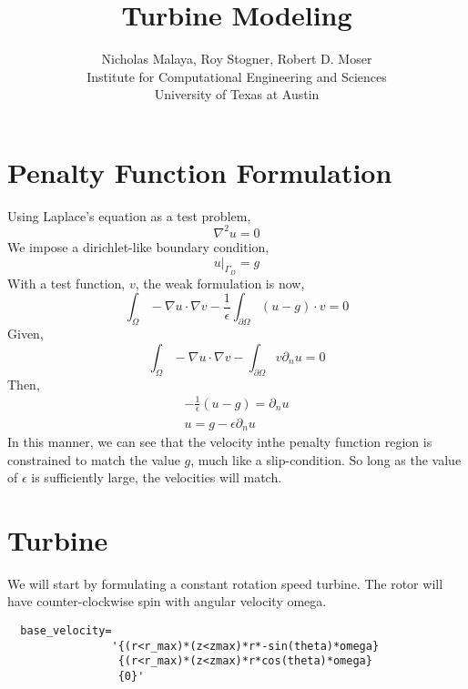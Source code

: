 \documentclass{article}
\title{\bf{Turbine Modeling}}
\author{Nicholas Malaya, Roy Stogner, Robert D. Moser \\ Institute for Computational Engineering and Sciences \\ University of Texas at Austin} \date{}
\begin{document}
\maketitle

\newpage

\section{Penalty Function Formulation}

Using Laplace's equation as a test problem, 
\begin{equation}
 \nabla^2 u = 0 
\end{equation}
We impose a dirichlet-like boundary condition, 
\begin{equation}
 u|_{\Gamma_D} = g
\end{equation}
With a test function, $v$, the weak formulation is now, 
\begin{equation}
\int_{\Omega}  - \nabla u \cdot \nabla v - \frac{1}{\epsilon}
 \int_{\partial \Omega} (u-g) \cdot v = 0 
\end{equation}
Given, 
\begin{equation}
\int_{\Omega}  - \nabla u \cdot \nabla v - 
 \int_{\partial \Omega} v \partial_n u = 0 
\end{equation}
Then, 
\begin{align}
-\frac{1}{\epsilon}(u-g) = \partial_n u \\
 u = g - \epsilon \partial_n u 
\end{align}
In this manner, we can see that the velocity inthe penalty function
region is constrained to match the value $g$, much like a
slip-condition. So long as the value of $\epsilon$ is sufficiently
large, the velocities will match. 


\section{Turbine}

We will start by formulating a constant rotation speed
turbine. The rotor will have counter-clockwise spin with angular
velocity omega.   

\begin{verbatim}
  base_velocity=
                '{(r<r_max)*(z<zmax)*r*-sin(theta)*omega}
                 {(r<r_max)*(z<zmax)*r*cos(theta)*omega}
                 {0}'
\end{verbatim}
\end{document}
